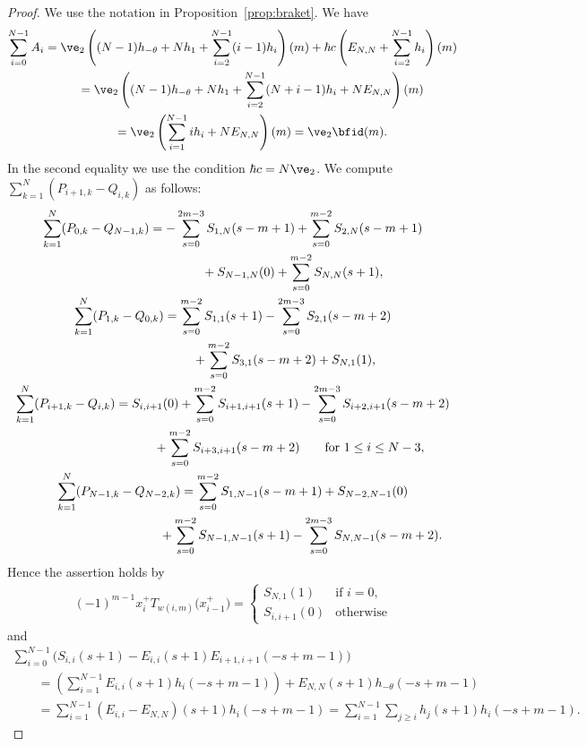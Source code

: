 \begin{proof} We use the notation in Proposition~\ref{prop:braket}. We have
\begin{gather*}
\sum_{i=0}^{N-1} A_i = \ve_2 \left((N-1)h_{-\theta} + N h_1 + \sum_{i=2}^{N-1}(i-1)h_i\right)(m) + \hbar c \left(E_{N,N}+\sum_{i=2}^{N-1} h_i\right)(m) \\
\hphantom{\sum_{i=0}^{N-1} A_i}{} = \ve_2 \left( (N-1)h_{-\theta} + Nh_1 + \sum_{i=2}^{N-1} (N+i-1) h_i + NE_{N,N} \right)(m) \\
\hphantom{\sum_{i=0}^{N-1} A_i}{} = \ve_2 \left( \sum_{i=1}^{N-1} i h_i + NE_{N,N}\right)(m)=\ve_2 \bfid(m).
\end{gather*}
In the second equality we use the condition $\hbar c = N\ve_2$. We compute $\sum\limits_{k=1}^{N} (P_{i+1,k}-Q_{i,k})$ as follows:
\begin{gather*}
\sum_{k=1}^{N} (P_{0,k}-Q_{N-1,k}) = - \sum_{s=0}^{2m-3}S_{1,N}(s-m+1) + \sum_{s=0}^{m-2}S_{2,N}(s-m+1)\\
\hphantom{\sum_{k=1}^{N} (P_{0,k}-Q_{N-1,k})=}{} +S_{N-1,N}(0)+\sum_{s=0}^{m-2} S_{N,N}(s+1),
\\
\sum_{k=1}^{N} (P_{1,k}-Q_{0,k}) = \sum_{s=0}^{m-2} S_{1,1}(s+1) - \sum_{s=0}^{2m-3}S_{2,1}(s-m+2) \\
\hphantom{\sum_{k=1}^{N} (P_{1,k}-Q_{0,k}) =}{} + \sum_{s=0}^{m-2}S_{3,1}(s-m+2)+S_{N,1}(1),
\\
\sum_{k=1}^{N} (P_{i+1,k}-Q_{i,k}) = S_{i,i+1}(0) + \sum_{s=0}^{m-2} S_{i+1,i+1}(s+1)- \sum_{s=0}^{2m-3}S_{i+2,i+1}(s-m+2) \\
\hphantom{\sum_{k=1}^{N} (P_{i+1,k}-Q_{i,k}) =}{} + \sum_{s=0}^{m-2}S_{i+3,i+1}(s-m+2) \qquad \text{for}\ 1 \leq i \leq N-3,
\\
\sum_{k=1}^{N} (P_{N-1,k}-Q_{N-2,k})= \sum_{s=0}^{m-2}S_{1,N-1}(s-m+1)+S_{N-2,N-1}(0)\\
\hphantom{\sum_{k=1}^{N} (P_{N-1,k}-Q_{N-2,k})=}{} +\sum_{s=0}^{m-2} S_{N-1,N-1}(s+1) - \sum_{s=0}^{2m-3}S_{N,N-1}(s-m+2).
\end{gather*}
Hence the assertion holds by
\begin{gather*}
(-1)^{m-1} x_i^+ T_{w(i,m)}\big(x_{i-1}^+\big) = \begin{cases}
S_{N,1}(1) & \text{if $i=0$,}\\
S_{i,i+1}(0) & \text{otherwise}
\end{cases}
\end{gather*}
and
\begin{gather*}
\sum_{i=0}^{N-1} \big( S_{i,i}(s+1) - E_{i,i}(s+1) E_{i+1,i+1}(-s+m-1) \big) \\
\qquad{}= \left( \sum_{i=1}^{N-1} E_{i,i}(s+1) h_{i}(-s+m-1) \right)+ E_{N,N}(s+1)h_{-\theta}(-s+m-1)\\
\qquad{} = \sum_{i=1}^{N-1} (E_{i,i}-E_{N,N})(s+1) h_{i}(-s+m-1) = \sum_{i=1}^{N-1} \sum_{j \geq i} h_j(s+1) h_i(-s+m-1).\tag*{\qed}
\end{gather*}\renewcommand{\qed}{}
\end{proof}

